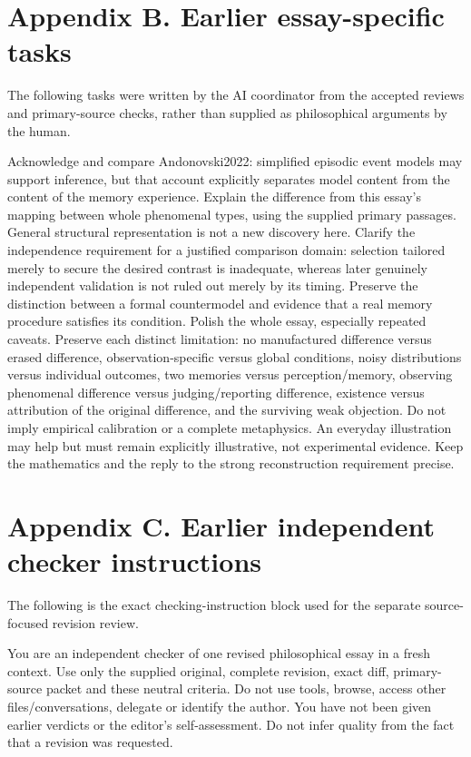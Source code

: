 \section*{Appendix B. Earlier essay-specific tasks}

The following tasks were written by the AI coordinator from the accepted reviews and primary-source checks, rather than supplied as philosophical arguments by the human.

Acknowledge and compare Andonovski2022: simplified episodic event models may support inference, but that account explicitly separates model content from the content of the memory experience. Explain the difference from this essay's mapping between whole phenomenal types, using the supplied primary passages. General structural representation is not a new discovery here.
Clarify the independence requirement for a justified comparison domain: selection tailored merely to secure the desired contrast is inadequate, whereas later genuinely independent validation is not ruled out merely by its timing. Preserve the distinction between a formal countermodel and evidence that a real memory procedure satisfies its condition.
Polish the whole essay, especially repeated caveats. Preserve each distinct limitation: no manufactured difference versus erased difference, observation-specific versus global conditions, noisy distributions versus individual outcomes, two memories versus perception/memory, observing phenomenal difference versus judging/reporting difference, existence versus attribution of the original difference, and the surviving weak objection. Do not imply empirical calibration or a complete metaphysics. An everyday illustration may help but must remain explicitly illustrative, not experimental evidence. Keep the mathematics and the reply to the strong reconstruction requirement precise.

\section*{Appendix C. Earlier independent checker instructions}

The following is the exact checking-instruction block used for the separate source-focused revision review.

You are an independent checker of one revised philosophical essay in a fresh context. Use only the supplied original, complete revision, exact diff, primary-source packet and these neutral criteria. Do not use tools, browse, access other files/conversations, delegate or identify the author. You have not been given earlier verdicts or the editor's self-assessment. Do not infer quality from the fact that a revision was requested.

